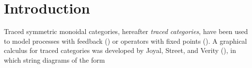 \chapter{Introduction}

Traced symmetric monoidal categories, hereafter \emph{traced categories}, have been used to model processes with feedback (\cite{http://arxiv.org/pdf/1401.5113v1.pdf})  or operators with fixed points (\cite{http://arxiv.org/pdf/1107.6032.pdf}). A graphical calculus for traced categories was developed by Joyal, Street, and Verity (\cite{JoyalStreetVerity}), in which string diagrams of the form
%
%
%
%
%
%
%
%

